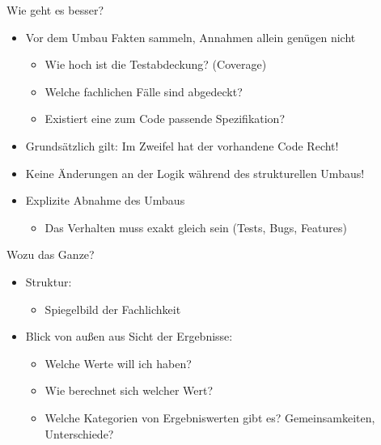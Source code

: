 \begin{frame}[fragile]{Wie geht es besser?}
\begin{itemize}
\item Vor dem Umbau Fakten sammeln, Annahmen allein genügen nicht
\begin{itemize}
\item Wie hoch ist die Testabdeckung? (Coverage)
\item Welche fachlichen Fälle sind abgedeckt?
\item Existiert eine zum Code passende Spezifikation?
\end{itemize}

\item Grundsätzlich gilt: Im Zweifel hat der vorhandene Code Recht!

\item Keine Änderungen an der Logik während des strukturellen Umbaus!

\item Explizite Abnahme des Umbaus
\begin{itemize}
\item Das Verhalten muss exakt gleich sein (Tests, Bugs, Features)
\end{itemize}

\end{itemize}
\end{frame}



\begin{frame}[fragile]{Wozu das Ganze?}
\begin{itemize}
\item Struktur:
\begin{itemize}
\item Spiegelbild der Fachlichkeit
\end{itemize}
\end{itemize}

\begin{itemize}
\item Blick von außen aus Sicht der Ergebnisse:
\begin{itemize}
\item Welche Werte will ich haben?
\item Wie berechnet sich welcher Wert?
\item Welche Kategorien von Ergebniswerten gibt es? Gemeinsamkeiten, Unterschiede?
\end{itemize}
\end{itemize}
\end{frame}


